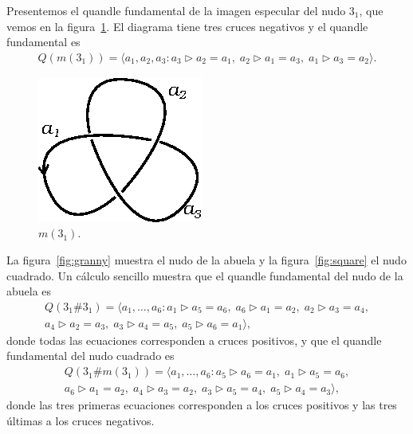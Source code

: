 \documentclass[graybox]{svmult}
\begin{document}
	Presentemos el quandle fundamental de la imagen especular del nudo $3_1$, que vemos en 
	la figura~\ref{fig:3_1m}. El diagrama tiene tres cruces negativos y el
	quandle fundamental es
	\begin{align*}
		Q(m(3_1))=\langle a_1,a_2,a_3:
		a_3\triangleright a_2=a_1,\;
		a_2\triangleright a_1=a_3,\;
		a_1\triangleright a_3=a_2\rangle.
	\end{align*}

	\begin{figure}[ht]
	    \centering
	    \includegraphics[scale=0.7]{images/3_1m}
		\caption{$m(3_1)$.}
    	\label{fig:3_1m}
	\end{figure}

    La figura~\ref{fig:granny} muestra el nudo de la abuela y la
    figura~\ref{fig:square} el nudo cuadrado.  Un cálculo sencillo muestra que 
    el quandle fundamental del nudo de la abuela es
    \begin{multline*}
		Q(3_1\#3_1)=\langle a_1,\dots,a_6:
        a_1\triangleright a_5=a_6,\;
        a_6\triangleright a_1=a_2,\;
        a_2\triangleright a_3=a_4,\\
		a_4\triangleright a_2=a_3,\;
        a_3\triangleright a_4=a_5,\;
        a_5\triangleright a_6=a_1\rangle,
	\end{multline*}
    donde todas las ecuaciones corresponden a cruces positivos, 
    y que el quandle fundamental del nudo cuadrado es
    \begin{multline}
		Q(3_1\#m(3_1))=\langle a_1,\dots,a_6:
        a_5\triangleright a_6=a_1,\;
		a_1\triangleright a_5=a_6,\\
        a_6\triangleright a_1=a_2,\;
        a_4\triangleright a_3=a_2,\;
		a_3\triangleright a_5=a_4,\;
        a_5\triangleright a_4=a_3\rangle,
    \end{multline}
    donde las tres primeras ecuaciones corresponden a los cruces positivos y
   	las tres últimas a los cruces negativos.
\end{document}
